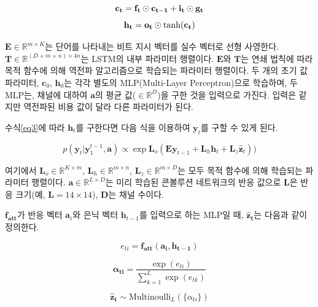 \documentclass{kcc}
\newcommand{\vy}[0]{\mathbf{y}}
\newcommand{\va}[0]{\mathbf{a}}
\newcommand{\vh}[0]{\mathbf{h}}
\newcommand{\vz}[0]{\mathbf{z}}
\newcommand{\mE}[0]{\mathbf{E}}
\newcommand{\mL}[0]{\mathbf{L}}
\newcommand{\mT}[0]{\mathbf{T}}
\newcommand{\sa}[0]{\mathbf{a}}
\begin{document}
\begin{equation}
\mathbf{c_t} = \mathbf{f_t} \odot \mathbf{c_{t-1}} + \mathbf{i_t} \odot \mathbf{g_t}\\
\end{equation}
\begin{equation}
\label{eq3}
\mathbf{h_t} = \mathbf{o_t} \odot \tanh(\mathbf{c_t})\\
\end{equation}

$\mE \in \mathbb{R}^{m \times K}$는 단어를 나타내는 비트 지시 벡터를 실수 벡터로 선형 사영한다.  $\mT \in \mathbb{R}^{(D+m+n) \times 4n}$는 LSTM의 내부 파라미터 행렬이다. $\mE$와 $\mT$는 연쇄 법칙에 따라 목적 함수에 의해 역전파 알고리즘으로 학습되는 파라미터 행렬이다. 두 개의 초기 값 파라미터, $\mathbf{c}_0$, $\mathbf{h}_0$는 각각 별도의 MLP(Multi-Layer Perceptron)으로 학습하며, 두 MLP는, 채널에 대하여 $\mathbf{a}$의 평균 값($\in \mathbb{R}^{D}$)을 구한 것을 입력으로 가진다. 입력은 같지만 역전파된 비용 값이 달라 다른 파라미터가 된다.

수식\ref{eq3}에 따라 $\vh_t$를 구한다면 다음 식을 이용하여 $\vy_t$를 구할 수 있게 된다.

\begin{equation}
p(\vy_t|\vy^{t-1}_1,\sa) \propto \exp{\mL_o(\mE\vy_{t-1} + \mL_{h}\vh_t + \mL_{z}\hat{\vz}_t))}
\end{equation}

여기에서 $\mathbf{L}_{o} \in \mathbb{R}^{K \times m}$, $\mathbf{L}_{h} \in \mathbb{R}^{m \times n}$, $\mathbf{L}_{z} \in \mathbb{R}^{m \times D}$는 모두 목적 함수에 의해 학습되는 파라미터 행렬이다. $\mathbf{a} \in \mathbb{R}^{L \times D}$는 미리 학습된 콘볼루션 네트워크의 반응 값으로 $\mathbf{L}$은 반응 크기(예, $\mathbf{L} = 14 \times 14$), $\mathbf{D}$는 채널 수이다. 

$\mathbf{f_{\text{att}}}$가 반응 벡터 $\va_i$와 은닉 벡터 $\vh_{t-1}$를 입력으로 하는  MLP일 때, $\mathbf{\hat{z}_t}$는 다음과 같이 정의한다.

\begin{equation}
e_{ti} = \mathbf{f_{\text{att}}}(\mathbf{a_i}, \mathbf{h_{t-1}})
\end{equation}

\begin{equation}
\mathbf{\alpha_{ti}} = \frac{\exp(e_{ti})}{\sum^{L}_{k=1}\exp(e_{tk})}
\end{equation}

\begin{equation}
\mathbf{\hat{z}_t} \sim \text{Multinoulli}_L(\{\alpha_{ti}\})
\end{equation}
\end{document}
